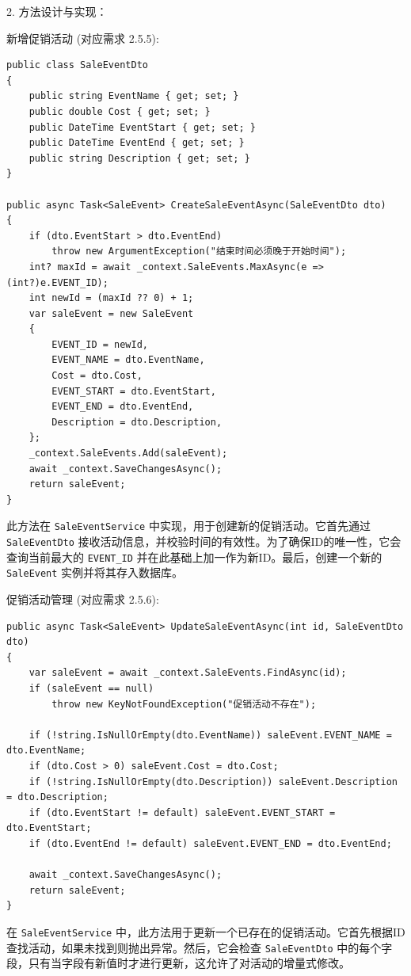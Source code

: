 \documentclass[]{article}
\begin{document}
2. 方法设计与实现：

新增促销活动 (对应需求 2.5.5):
\begin{verbatim}
public class SaleEventDto
{
    public string EventName { get; set; }
    public double Cost { get; set; }
    public DateTime EventStart { get; set; }
    public DateTime EventEnd { get; set; }
    public string Description { get; set; }
}

public async Task<SaleEvent> CreateSaleEventAsync(SaleEventDto dto)
{
    if (dto.EventStart > dto.EventEnd)
        throw new ArgumentException("结束时间必须晚于开始时间");
    int? maxId = await _context.SaleEvents.MaxAsync(e => (int?)e.EVENT_ID);
    int newId = (maxId ?? 0) + 1;
    var saleEvent = new SaleEvent
    {
        EVENT_ID = newId,
        EVENT_NAME = dto.EventName,
        Cost = dto.Cost,
        EVENT_START = dto.EventStart,
        EVENT_END = dto.EventEnd,
        Description = dto.Description,
    };
    _context.SaleEvents.Add(saleEvent);
    await _context.SaveChangesAsync();
    return saleEvent;
}
\end{verbatim}
此方法在 \texttt{SaleEventService} 中实现，用于创建新的促销活动。它首先通过 \texttt{SaleEventDto} 接收活动信息，并校验时间的有效性。为了确保ID的唯一性，它会查询当前最大的 \texttt{EVENT\_ID} 并在此基础上加一作为新ID。最后，创建一个新的 \texttt{SaleEvent} 实例并将其存入数据库。

促销活动管理 (对应需求 2.5.6):
\begin{verbatim}
public async Task<SaleEvent> UpdateSaleEventAsync(int id, SaleEventDto dto)
{
    var saleEvent = await _context.SaleEvents.FindAsync(id);
    if (saleEvent == null)
        throw new KeyNotFoundException("促销活动不存在");
    
    if (!string.IsNullOrEmpty(dto.EventName)) saleEvent.EVENT_NAME = dto.EventName;
    if (dto.Cost > 0) saleEvent.Cost = dto.Cost;
    if (!string.IsNullOrEmpty(dto.Description)) saleEvent.Description = dto.Description;
    if (dto.EventStart != default) saleEvent.EVENT_START = dto.EventStart;
    if (dto.EventEnd != default) saleEvent.EVENT_END = dto.EventEnd;

    await _context.SaveChangesAsync();
    return saleEvent;
}
\end{verbatim}
在 \texttt{SaleEventService} 中，此方法用于更新一个已存在的促销活动。它首先根据ID查找活动，如果未找到则抛出异常。然后，它会检查 \texttt{SaleEventDto} 中的每个字段，只有当字段有新值时才进行更新，这允许了对活动的增量式修改。
\end{document}
